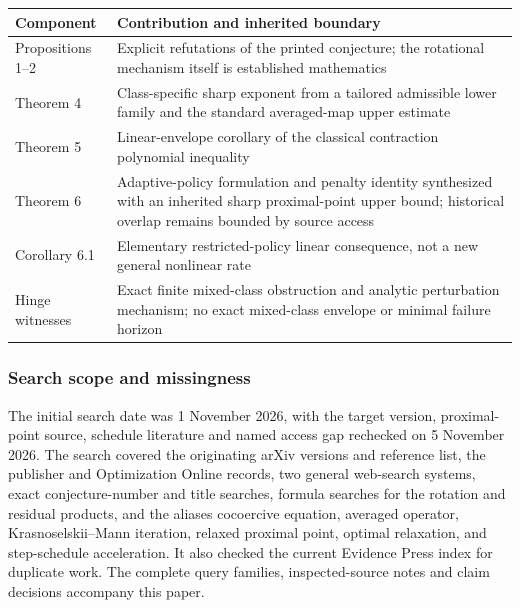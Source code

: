 \documentclass[
  british,
  11pt,
  a4paper,
]{article}
\newcounter{none} %
\begin{document}
{\def\LTcaptype{none} %
\begin{longtable}[]{@{}
  >{\raggedright\arraybackslash}p{}
  >{\raggedright\arraybackslash}p{}@{}}
\toprule\noalign{}
\begin{minipage}[b]{\linewidth}\raggedright
Component
\end{minipage} & \begin{minipage}[b]{\linewidth}\raggedright
Contribution and inherited boundary
\end{minipage} \\
\midrule\noalign{}
\endhead
\bottomrule\noalign{}
\endlastfoot
Propositions 1--2 & Explicit refutations of the printed conjecture; the
rotational mechanism itself is established mathematics \\
Theorem 4 & Class-specific sharp exponent from a tailored admissible
lower family and the standard averaged-map upper estimate \\
Theorem 5 & Linear-envelope corollary of the classical contraction
polynomial inequality \\
Theorem 6 & Adaptive-policy formulation and penalty identity synthesized
with an inherited sharp proximal-point upper bound; historical overlap
remains bounded by source access \\
Corollary 6.1 & Elementary restricted-policy linear consequence, not a
new general nonlinear rate \\
Hinge witnesses & Exact finite mixed-class obstruction and analytic
perturbation mechanism; no exact mixed-class envelope or minimal failure
horizon \\
\end{longtable}
}

\subsubsection{Search scope and
missingness}\label{search-scope-and-missingness}

The initial search date was 1 November 2026, with the target version,
proximal-point source, schedule literature and named access gap
rechecked on 5 November 2026. The search covered the originating arXiv
versions and reference list, the publisher and Optimization Online
records, two general web-search systems, exact conjecture-number and
title searches, formula searches for the rotation and residual products,
and the aliases cocoercive equation, averaged operator,
Krasnoselskii--Mann iteration, relaxed proximal point, optimal
relaxation, and step-schedule acceleration. It also checked the current
Evidence Press index for duplicate work. The complete query families,
inspected-source notes and claim decisions accompany this paper.
\end{document}
